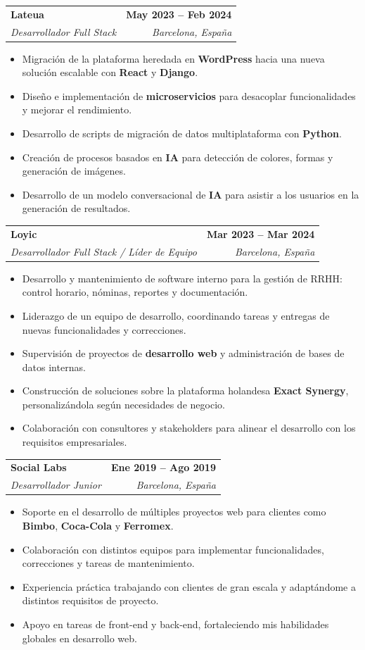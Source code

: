 \documentclass[letterpaper,11pt]{article}
\makeatletter
\newcommand{\resumeItem}[1]{
  \item\small{
    {#1 \vspace{-2pt}}
  }
}
\newcommand{\resumeSubheading}[4]{
  \vspace{-2pt}\item
    \begin{tabular*}{1.0\textwidth}[t]{l@{\extracolsep{\fill}}r}
      \textbf{#1} & \textbf{\small #2} \\
      \textit{\small#3} & \textit{\small #4} \\
    \end{tabular*}\vspace{-7pt}
}
\newcommand{\resumeItemListStart}{\begin{itemize}}
\newcommand{\resumeItemListEnd}{\end{itemize}\vspace{-5pt}}
\makeatother
\begin{document}
    \resumeSubheading
      {Lateua}{May 2023 -- Feb 2024}
      {Desarrollador Full Stack}{Barcelona, España}
      \resumeItemListStart
        \resumeItem{Migración de la plataforma heredada en \textbf{WordPress} hacia una nueva solución escalable con \textbf{React} y \textbf{Django}.}
        \resumeItem{Diseño e implementación de \textbf{microservicios} para desacoplar funcionalidades y mejorar el rendimiento.}
        \resumeItem{Desarrollo de scripts de migración de datos multiplataforma con \textbf{Python}.}
        \resumeItem{Creación de procesos basados en \textbf{IA} para detección de colores, formas y generación de imágenes.}
        \resumeItem{Desarrollo de un modelo conversacional de \textbf{IA} para asistir a los usuarios en la generación de resultados.}
      \resumeItemListEnd
    \vspace{8pt}

    \resumeSubheading
      {Loyic}{Mar 2023 -- Mar 2024}
      {Desarrollador Full Stack / Líder de Equipo}{Barcelona, España}
      \resumeItemListStart
        \resumeItem{Desarrollo y mantenimiento de software interno para la gestión de RRHH: control horario, nóminas, reportes y documentación.}
        \resumeItem{Liderazgo de un equipo de desarrollo, coordinando tareas y entregas de nuevas funcionalidades y correcciones.}
        \resumeItem{Supervisión de proyectos de \textbf{desarrollo web} y administración de bases de datos internas.}
        \resumeItem{Construcción de soluciones sobre la plataforma holandesa \textbf{Exact Synergy}, personalizándola según necesidades de negocio.}
        \resumeItem{Colaboración con consultores y stakeholders para alinear el desarrollo con los requisitos empresariales.}
      \resumeItemListEnd
    \vspace{8pt}

    \resumeSubheading
      {Social Labs}{Ene 2019 -- Ago 2019}
      {Desarrollador Junior}{Barcelona, España}
      \resumeItemListStart
        \resumeItem{Soporte en el desarrollo de múltiples proyectos web para clientes como \textbf{Bimbo}, \textbf{Coca-Cola} y \textbf{Ferromex}.}
        \resumeItem{Colaboración con distintos equipos para implementar funcionalidades, correcciones y tareas de mantenimiento.}
        \resumeItem{Experiencia práctica trabajando con clientes de gran escala y adaptándome a distintos requisitos de proyecto.}
        \resumeItem{Apoyo en tareas de front-end y back-end, fortaleciendo mis habilidades globales en desarrollo web.}
      \resumeItemListEnd
    \vspace{8pt}
    
\end{document}
